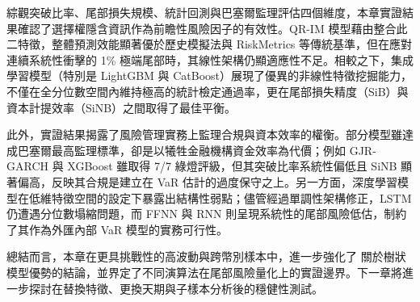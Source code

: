 綜觀突破比率、尾部損失規模、統計回測與巴塞爾監理評估四個維度，本章實證結果確認了選擇權隱含資訊作為前瞻性風險因子的有效性。QR-IM 模型藉由整合此二特徵，整體預測效能顯著優於歷史模擬法與 RiskMetrics 等傳統基準，但在應對連續系統性衝擊的 1\% 極端尾部時，其線性架構仍顯適應性不足。相較之下，集成學習模型（特別是 LightGBM 與 CatBoost）展現了優異的非線性特徵挖掘能力，不僅在全分位數空間內維持極高的統計檢定通過率，更在尾部損失精度（SiB）與資本計提效率（SiNB）之間取得了最佳平衡。

此外，實證結果揭露了風險管理實務上監理合規與資本效率的權衡。部分模型雖達成巴塞爾最高監理標準，卻是以犧牲金融機構資金效率為代價；例如 GJR-GARCH 與 XGBoost 雖取得 7/7 綠燈評級，但其突破比率系統性偏低且 SiNB 顯著偏高，反映其合規是建立在 VaR 估計的過度保守之上。另一方面，深度學習模型在低維特徵空間的設定下暴露出結構性弱點；儘管經過單調性架構修正，LSTM 仍遭遇分位數塌縮問題，而 FFNN 與 RNN 則呈現系統性的尾部風險低估，制約了其作為外匯內部 VaR 模型的實務可行性。

總結而言，本章在更具挑戰性的高波動與跨幣別樣本中，進一步強化了 \citet{blom2023estimating} 關於樹狀模型優勢的結論，並界定了不同演算法在尾部風險量化上的實證邊界。下一章將進一步探討在替換特徵、更換天期與子樣本分析後的穩健性測試。